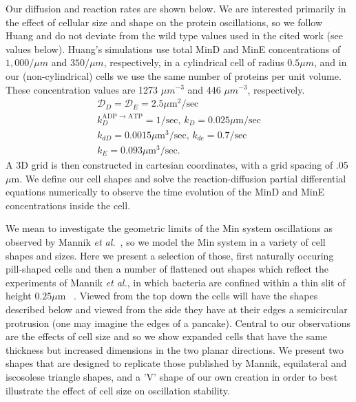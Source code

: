 \documentclass[letterpaper,twocolumn,amsmath,amssymb,pre]{revtex4-1}
\newcommand\micron{\ensuremath{\mu\text{m}}}
\begin{document}
Our diffusion and reaction rates are shown below.  We are interested
primarily in the effect of cellular size and shape on the protein
oscillations, so we follow Huang\cite{huang2003dynamic} and do not
deviate from the wild type values used in the cited work (see values
below).  Huang's simulations use total MinD and MinE concentrations of
$1,000/\mu m$ and $350/\mu m$, respectively, in a cylindrical cell of
radius $0.5\mu m$, and in our (non-cylindrical) cells we use the same
number of proteins per unit volume.  These concentration values are
1273 $\mu m^{-3}$ and 446 $\mu m^{-3}$, respectively.
\begin{gather*}
  \mathcal{D}_D = \mathcal{D}_{E} = 2.5\micron^2/\text{sec}\\
  k_D^{\textrm{ADP $\rightarrow$ ATP}} = 1/\textrm{sec,  }
  k_D = 0.025 \micron /\textrm{sec}\\
  k_{dD} = 0.0015 \micron^3/ \textrm{sec,  }
  k_{de} = 0.7/\textrm{sec}\\
  k_E = 0.093 \micron^3 /\textrm{sec}.
\end{gather*}
A 3D grid is then constructed in cartesian coordinates, with a grid
spacing of .05\micron. We define our cell shapes and solve the
reaction-diffusion partial differential equations numerically to
observe the time evolution of the MinD and MinE concentrations inside
the cell.

We mean to investigate the geometric limits of the Min system
oscillations as observed by Mannik \emph{et
  al.}~\cite{mannik2012robustness}, so we model the Min system in a
variety of cell shapes and sizes.  Here we present a selection of
those, first naturally occuring pill-shaped cells and then a
number of flattened out shapes which reflect the experiments of Mannik
\emph{et al.}, in which bacteria are confined within a thin slit of
height $0.25\micron$ ~\cite{mannik2012robustness}. Viewed from the top
down the cells will have the shapes described below and viewed from
the side they have at their edges a semicircular protrusion (one may
imagine the edges of a pancake). Central to our observations are the
effects of cell size and so we show expanded cells that have the same
thickness but increased dimensions in the two planar directions.  We
present two shapes that are designed to replicate those published by
Mannik, equilateral and iscosolese triangle shapes, and a 'V' shape of
our own creation in order to best illustrate the effect of cell size
on oscillation stability.

\end{document}
